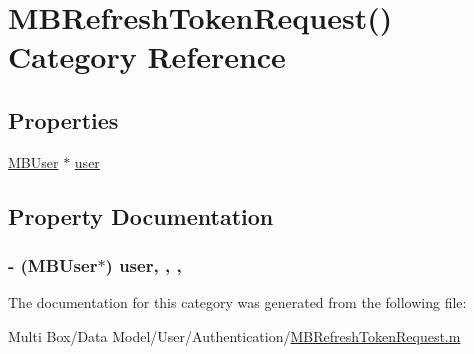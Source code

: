 \hypertarget{category_m_b_refresh_token_request_07_08}{\section{M\-B\-Refresh\-Token\-Request() Category Reference}
\label{category_m_b_refresh_token_request_07_08}
}
\subsection*{Properties}
\begin{DoxyCompactItemize}
\item 
\hyperlink{interface_m_b_user}{M\-B\-User} $\ast$ \hyperlink{category_m_b_refresh_token_request_07_08_ae8dc212338dc50b6c516604ef10ae664}{user}
\end{DoxyCompactItemize}


\subsection{Property Documentation}
\hypertarget{category_m_b_refresh_token_request_07_08_ae8dc212338dc50b6c516604ef10ae664}{
\subsubsection[{user}]{\setlength{\rightskip}{0pt plus 5cm}-\/ ({\bf M\-B\-User}$\ast$) user\hspace{0.3cm}{\ttfamily [read]}, {\ttfamily [write]}, {\ttfamily [nonatomic]}, {\ttfamily [strong]}}}\label{category_m_b_refresh_token_request_07_08_ae8dc212338dc50b6c516604ef10ae664}


The documentation for this category was generated from the following file\-:\begin{DoxyCompactItemize}
\item 
Multi Box/\-Data Model/\-User/\-Authentication/\hyperlink{_m_b_refresh_token_request_8m}{M\-B\-Refresh\-Token\-Request.\-m}\end{DoxyCompactItemize}
